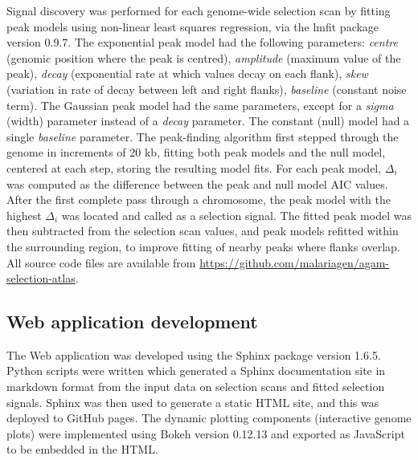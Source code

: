 \begin{refsection}
Signal discovery was performed for each genome-wide selection scan by fitting peak models using non-linear least squares regression, via the lmfit package version 0.9.7.
%
The exponential peak model had the following parameters: \textit{centre} (genomic position where the peak is centred), \textit{amplitude} (maximum value of the peak), \textit{decay} (exponential rate at which values decay on each flank), \textit{skew} (variation in rate of decay between left and right flanks), \textit{baseline} (constant noise term).
%
The Gaussian peak model had the same parameters, except for a \textit{sigma} (width) parameter instead of a \textit{decay} parameter.
%
The constant (null) model had a single \textit{baseline} parameter.
%
The peak-finding algorithm first stepped through the genome in increments of 20 kb, fitting both peak models and the null model, centered at each step, storing the resulting model fits.
%
For each peak model, $\Delta_i$ was computed as the difference between the peak and null model AIC values.
%
After the first complete pass through a chromosome, the peak model with the highest $\Delta_i$ was located and called as a selection signal.
%
The fitted peak model was then subtracted from the selection scan values, and peak models refitted within the surrounding region, to improve fitting of nearby peaks where flanks overlap.
%
All source code files are available from \url{https://github.com/malariagen/agam-selection-atlas}.


\subsection{Web application development}\label{subsec:methods-webapp}


The Web application was developed using the Sphinx package version 1.6.5.
%
Python scripts were written which generated a Sphinx documentation site in markdown format from the input data on selection scans and fitted selection signals.
%
Sphinx was then used to generate a static HTML site, and this was deployed to GitHub pages.
%
The dynamic plotting components (interactive genome plots) were implemented using Bokeh version 0.12.13 and exported as JavaScript to be embedded in the HTML.


\clearpage

\end{refsection}
